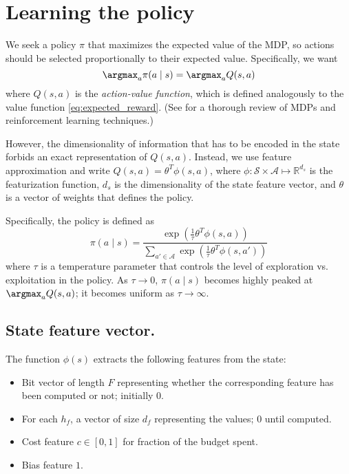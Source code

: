 \section{Learning the policy}
We seek a policy $\pi$ that maximizes the expected value of the MDP, so actions should be selected proportionally to their expected value.
Specifically, we want
\begin{equation*}
\argmax_a \pi(a \mid s) = \argmax_a Q(s,a)
\end{equation*}
where $Q(s,a)$ is the \emph{action-value function}, which is defined analogously to the value function \eqref{eq:expected_reward}.
(See \cite{Sutton1998} for a thorough review of MDPs and reinforcement learning techniques.)

However, the dimensionality of information that has to be encoded in the state forbids an exact representation of $Q(s,a)$.
Instead, we use feature approximation and write $Q(s,a) = \theta^T \phi(s, a)$,  where $\phi: \mathcal{S} \times \mathcal{A} \mapsto \mathbb{R}^{d_s}$ is the featurization function, $d_s$ is the dimensionality of the state feature vector, and $\theta$ is a vector of weights that defines the policy.

Specifically, the policy is defined as
\begin{equation}
\pi(a \mid s) = \frac{\exp\left(\frac{1}{\tau} \theta^T \phi(s, a)\right)}{\sum\limits_{a' \in \mathcal{A}} \exp\left(\frac{1}{\tau} \theta^T \phi(s, a')\right)}
\end{equation}
where $\tau$ is a temperature parameter that controls the level of exploration vs. exploitation in the policy.
As $\tau \rightarrow 0$, ${\pi(a \mid s)}$ becomes highly peaked at $\argmax_a Q(s,a)$; it becomes uniform as $\tau \rightarrow \infty$.

\subsection{State feature vector.} \label{sec:policy_features}

The function $\phi(s)$ extracts the following features from the state:

\begin{itemize}
\item Bit vector of length $F$ representing whether the corresponding feature has been computed or not; initially $0$.
\item For each $h_f$, a vector of size $d_f$ representing the values; $0$ until computed.
\item Cost feature $c \in [0, 1]$ for fraction of the budget spent.
\item Bias feature $1$.
\end{itemize}

